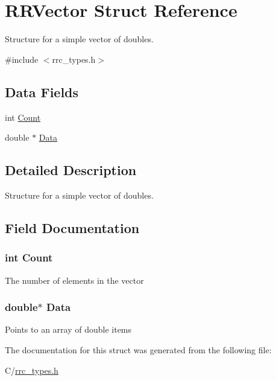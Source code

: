\hypertarget{struct_r_r_vector}{\section{R\-R\-Vector Struct Reference}
\label{struct_r_r_vector}
}


Structure for a simple vector of doubles.  




{\ttfamily \#include $<$rrc\-\_\-types.\-h$>$}

\subsection*{Data Fields}
\begin{DoxyCompactItemize}
\item 
int \hyperlink{struct_r_r_vector_aad462966ed963f892117056de1eba502}{Count}
\item 
double $\ast$ \hyperlink{struct_r_r_vector_a7c5cbda3aa940f4b0d6e8a1679307dfc}{Data}
\end{DoxyCompactItemize}


\subsection{Detailed Description}
Structure for a simple vector of doubles. 

\subsection{Field Documentation}
\hypertarget{struct_r_r_vector_aad462966ed963f892117056de1eba502}{
\subsubsection[{Count}]{\setlength{\rightskip}{0pt plus 5cm}int Count}}\label{struct_r_r_vector_aad462966ed963f892117056de1eba502}
The number of elements in the vector \hypertarget{struct_r_r_vector_a7c5cbda3aa940f4b0d6e8a1679307dfc}{
\subsubsection[{Data}]{\setlength{\rightskip}{0pt plus 5cm}double$\ast$ Data}}\label{struct_r_r_vector_a7c5cbda3aa940f4b0d6e8a1679307dfc}
Points to an array of double items 

The documentation for this struct was generated from the following file\-:\begin{DoxyCompactItemize}
\item 
C/\hyperlink{rrc__types_8h}{rrc\-\_\-types.\-h}\end{DoxyCompactItemize}

